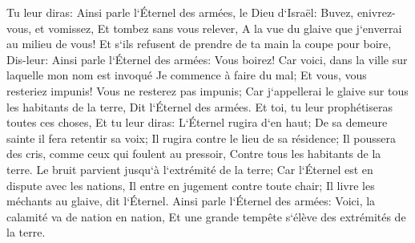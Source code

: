 \verse Tu leur diras: Ainsi parle l`Éternel des armées, le Dieu d`Israël: Buvez, enivrez-vous, et vomissez, Et tombez sans vous relever, A la vue du glaive que j`enverrai au milieu de vous! 
\verse Et s`ils refusent de prendre de ta main la coupe pour boire, Dis-leur: Ainsi parle l`Éternel des armées: Vous boirez! 
\verse Car voici, dans la ville sur laquelle mon nom est invoqué Je commence à faire du mal; Et vous, vous resteriez impunis! Vous ne resterez pas impunis; Car j`appellerai le glaive sur tous les habitants de la terre, Dit l`Éternel des armées. 
\verse Et toi, tu leur prophétiseras toutes ces choses, Et tu leur diras: L`Éternel rugira d`en haut; De sa demeure sainte il fera retentir sa voix; Il rugira contre le lieu de sa résidence; Il poussera des cris, comme ceux qui foulent au pressoir, Contre tous les habitants de la terre. 
\verse Le bruit parvient jusqu`à l`extrémité de la terre; Car l`Éternel est en dispute avec les nations, Il entre en jugement contre toute chair; Il livre les méchants au glaive, dit l`Éternel. 
\verse Ainsi parle l`Éternel des armées: Voici, la calamité va de nation en nation, Et une grande tempête s`élève des extrémités de la terre. 
